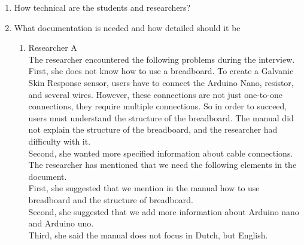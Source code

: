 \documentclass[conference]{IEEEtran}
\begin{document}
		\begin{enumerate}
			\item How technical are the students and researchers?
				\item What documentation is needed and how detailed should it be
				


				\begin{enumerate}
					\item Researcher A\\

						The researcher encountered the following problems during the interview.\\

						First, she does not know how to use a breadboard. To create a Galvanic Skin Response sensor, users have to connect the Arduino Nano, resistor, and several wires. However, these connections are not just one-to-one connections, they require multiple connections. So in order to succeed, users must understand the structure of the breadboard. The manual did not explain the structure of the breadboard, and the researcher had difficulty with it.\\
						Second, she wanted more specified information about cable connections.\\
						The researcher has mentioned that we need the following elements in the document.\\
						First, she suggested that we mention in the manual how to use breadboard and the structure of breadboard. \\
						Second, she suggested that we add more information about Arduino nano and Arduino uno.\\
						Third, she said the manual does not focus in Dutch, but English. \\		
						

\end{enumerate}
\end{enumerate}
\end{document}
